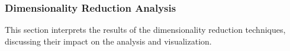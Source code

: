 \subsubsection{Dimensionality Reduction Analysis}
\label{subsubsec:discussion-reduction}

This section interprets the results of the dimensionality reduction techniques, discussing their impact on the analysis and visualization.


